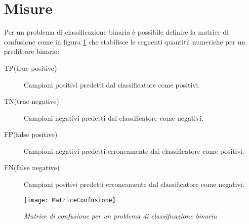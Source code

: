 \section{Misure}
\label{sub:measure}
Per un problema di classificazione binaria è possibile definire la matrice di confusione come in figura \ref{fig:mco} che stabilisce le seguenti quantità numeriche per un predittore binario:
\begin{description}
\item[TP(true positive)] Campioni positivi predetti dal classificatore come positivi.
\item[TN(true negative)] Campioni negativi predetti dal classificatore come negativi.
\item[FP(false positive)] Campioni negativi predetti erroneamente dal classificatore come positivi.
\item[FN(false negative)] Campioni positivi predetti erroneamente dal classificatore come negativi.
\end{description}

\begin{figure}[htp]
	\centering
	\texttt{[image: MatriceConfusione]}
	\caption[Matrice di confusione]{\textit{Matrice di confusione per un problema di classificazione binaria}}
   \label{fig:mco}
\end{figure}

